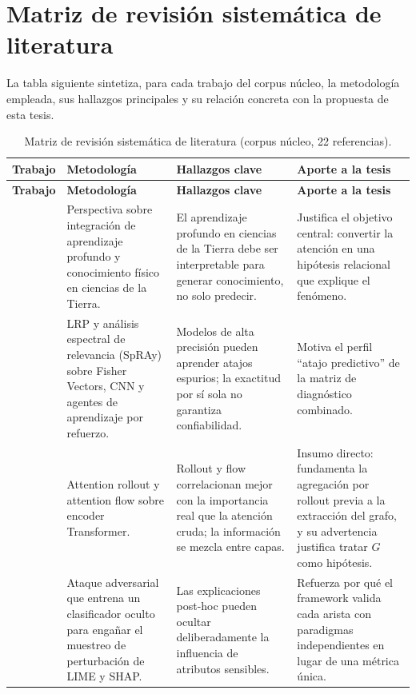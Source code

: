 
\section{Matriz de revisión sistemática de literatura}

La tabla siguiente sintetiza, para cada trabajo del corpus núcleo, la metodología empleada, sus hallazgos principales y su relación concreta con la propuesta de esta tesis.

{\small
\begin{longtable}{P{0.19}P{0.25}P{0.28}P{0.28}}
\caption{Matriz de revisión sistemática de literatura (corpus núcleo, 22 referencias).}\label{tab:matriz}\\
\toprule
\textbf{Trabajo} & \textbf{Metodología} & \textbf{Hallazgos clave} & \textbf{Aporte a la tesis}\\
\midrule
\endfirsthead
\toprule
\textbf{Trabajo} & \textbf{Metodología} & \textbf{Hallazgos clave} & \textbf{Aporte a la tesis}\\
\midrule
\endhead
\cite{reichstein2019deep} & Perspectiva sobre integración de aprendizaje profundo y conocimiento físico en ciencias de la Tierra. & El aprendizaje profundo en ciencias de la Tierra debe ser interpretable para generar conocimiento, no solo predecir. & Justifica el objetivo central: convertir la atención en una hipótesis relacional que explique el fenómeno.\\
\cite{lapuschkin2019unmasking} & LRP y análisis espectral de relevancia (SpRAy) sobre Fisher Vectors, CNN y agentes de aprendizaje por refuerzo. & Modelos de alta precisión pueden aprender atajos espurios; la exactitud por sí sola no garantiza confiabilidad. & Motiva el perfil ``atajo predictivo'' de la matriz de diagnóstico combinado.\\
\cite{abnar2020quantifying} & Attention rollout y attention flow sobre encoder Transformer. & Rollout y flow correlacionan mejor con la importancia real que la atención cruda; la información se mezcla entre capas. & Insumo directo: fundamenta la agregación por rollout previa a la extracción del grafo, y su advertencia justifica tratar $G$ como hipótesis.\\
\cite{slack2020fooling} & Ataque adversarial que entrena un clasificador oculto para engañar el muestreo de perturbación de LIME y SHAP. & Las explicaciones post-hoc pueden ocultar deliberadamente la influencia de atributos sensibles. & Refuerza por qué el framework valida cada arista con paradigmas independientes en lugar de una métrica única.\\

\end{longtable}}
